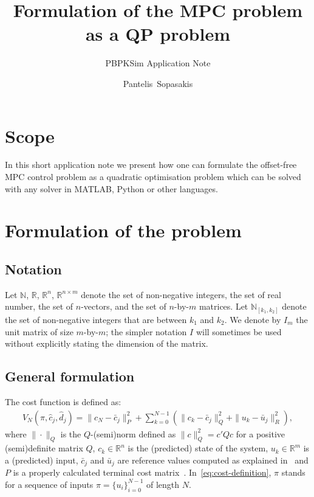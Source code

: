 \documentclass[12pt]{scrartcl}
\title{Formulation of the MPC problem as a QP problem}
\subtitle{PBPKSim Application Note}
\author{Pantelis~Sopasakis}
\newcommand{\N}{\mathbb{N}}
\renewcommand{\Re}{\mathbb{R}}
\begin{document}
\maketitle

\section*{Scope}
In this short application note we present how 
one can formulate the offset-free MPC control problem
as a quadratic optimisation problem which can be solved
with any solver in MATLAB, Python or other languages. 

\section*{Formulation of the problem}

\subsection*{Notation}
Let $\N$, $\Re$, $\Re^n$, $\Re^{n\times m}$ denote the set
of non-negative integers, the set of real number, the set of $n$-vectors,
and the set of $n$-by-$m$ matrices. Let $\N_{[k_1, k_2]}$ denote the
set of non-negative integers that are between $k_1$ and $k_2$.
We denote by $I_m$ the unit matrix of size $m$-by-$m$; the simpler
notation $I$ will sometimes be used without explicitly stating the
dimension of the matrix.

\subsection*{General formulation}
The cost function is defined as:
\begin{align}\label{eq:cost-definition}
V_N(\pi, \hat{c}_j, \hat{d}_j) = \|c_N - \bar{c}_j\|_P^2 + \sum_{k=0}^{N-1}\left( 
\|c_k-\bar{c}_j\|_Q^2+\|u_k-\bar{u}_j\|_R^2
\right),
\end{align}
where $\|\cdot\|_Q$ is the $Q$-(semi)norm defined as $\|c\|_Q^2=c'Qc$ for 
a positive (semi)definite matrix $Q$, $c_k\in\Re^n$ is the (predicted) state of the system,
$u_k\in\Re^m$ is a (predicted) input, $\bar{c}_j$ and $\bar{u}_j$ are reference values
computed as explained in~\cite[Eq. (33)]{SopPatSar14} and $P$ is a 
properly calculated terminal cost matrix~\cite[Eq. (32)]{SopPatSar14}.
In~\eqref{eq:cost-definition}, $\pi$ stands for a sequence of inputs
$\pi=\{u_i\}_{i=0}^{N-1}$ of length $N$.
\end{document}
